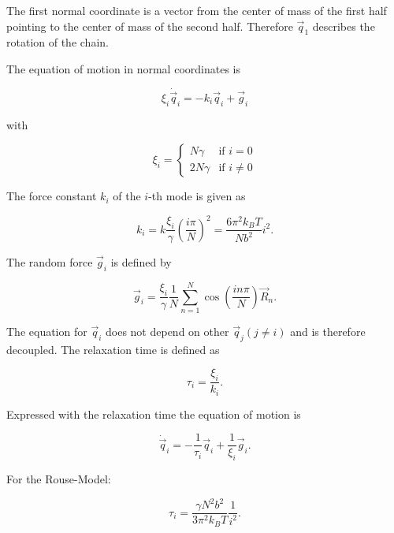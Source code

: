 \documentclass[a4paper]{article}
\begin{document}
The first normal coordinate is a vector from the center of mass of the first half pointing to the center of mass of the second half. Therefore $\vec{q}_1$ describes the rotation of the chain. 

The equation of motion in normal coordinates is

\begin{equation}
\xi_i \dot{\vec{q}}_i = -k_i \vec{q}_i + \vec{g}_i
\end{equation}

with

\begin{equation}
\xi_i = \begin{cases} N \gamma &\mbox{if } i = 0 \\ 
2 N \gamma & \mbox{if } i \neq 0 \end{cases}
\end{equation}

The force constant $k_i$ of the $i$-th mode is given as

\begin{equation}
k_i = k \frac{\xi_i}{\gamma} \left( \frac{i \pi}{N} \right)^2 = \frac{6 \pi^2 k_B T}{N b^2} i^2.
\end{equation}

The random force $\vec{g}_i$ is defined by

\begin{equation}
\vec{g}_i = \frac{\xi_i}{\gamma} \frac{1}{N} \sum_{n=1}^N \cos \left( \frac{i n \pi}{N} \right) \vec{R}_n.
\end{equation}

The equation for $\vec{q}_i$ does not depend on other $\vec{q}_j (j \neq i)$ and is therefore decoupled. The relaxation time is defined as

\begin{equation}
\tau_i = \frac{\xi_i}{k_i}.
\end{equation}

Expressed with the relaxation time the equation of motion is

\begin{equation}
\dot{\vec{q}}_i = - \frac{1}{\tau_i} \vec{q}_i + \frac{1}{\xi_i} \vec{g}_i.
\end{equation}

For the Rouse-Model:

\begin{equation}
\tau_i = \frac{\gamma N^2 b^2}{3 \pi^2 k_B T} \frac{1}{i^2}.
\end{equation}
\end{document}
